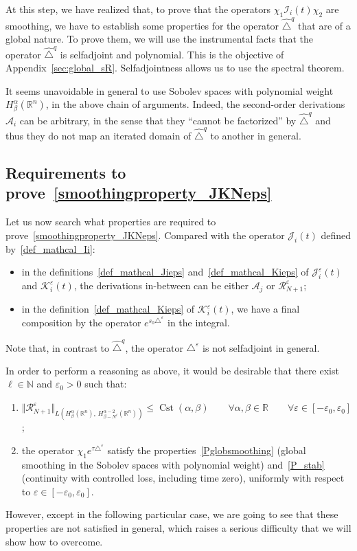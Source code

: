 \documentclass[AHL,Unicode,published]{cedram}
\newcommand*\R{\mathbb{R}}
\newcommand*\N{\mathbb{N}}
\newcommand{\calK}{\mathcal{K}}
\newcommand{\calA}{\mathcal{A}}
\newcommand{\calR}{\mathcal{R}}
\newcommand{\calI}{\mathcal{I}}
\newcommand{\calJ}{\mathcal{J}}
\DeclareMathOperator{\Cst}{Cst}
\renewcommand{\leq}{\leqslant}
\newcommand*{\romanenumi}{\renewcommand*{\theenumi}{\roman{enumi}}}
\let\oldforall\forall
\renewcommand*{\forall}{\mathrel{\oldforall}}
\begin{document}
At this step, we have realized that, to prove that the operators $\chi_1\calI_i(t)\chi_2$ are smoothing, we have to establish some properties for the operator $\widehat{\triangle}^q$ that are of a global nature. To prove them, we will use the instrumental facts that the operator $\widehat{\triangle}^q$ is selfadjoint and polynomial. This is the objective of Appendix~\ref{sec:global_sR}. Selfadjointness allows us to use the spectral theorem.

\begin{rema}
It seems unavoidable in general to use Sobolev spaces with polynomial weight $H^\alpha_\beta(\R^n)$, in the above chain of arguments. Indeed, the second-order derivations $\calA_i$ can be arbitrary, in the sense that they ``cannot be factorized'' by $\widehat{\triangle}^{q}$ and thus they do not map an iterated domain of $\widehat{\triangle}^{q}$ to another in general.
\end{rema}


\subsection{Requirements to prove~\eqref{smoothingproperty_JKNeps}}\label{sec_idea_eps}
Let us now search what properties are required to prove~\eqref{smoothingproperty_JKNeps}. Compared with the operator $\calJ_i(t)$ defined by~\eqref{def_mathcal_Ii}:
\begin{itemize}
\item in the definitions~\eqref{def_mathcal_Jieps} and~\eqref{def_mathcal_Kieps} of $\calJ_i^\varepsilon(t)$ and $\calK_i^\varepsilon(t)$, the derivations in-between can be either $\calA_j$ or $\calR_{N+1}^\varepsilon$;
\item in the definition~\eqref{def_mathcal_Kieps} of $\calK_i^\varepsilon(t)$, we have a final composition by the operator $e^{s_0\triangle^\varepsilon}$ in the integral.
\end{itemize}
Note that, in contrast to $\widehat{\triangle}^q$, the operator $\triangle^\varepsilon$ is not selfadjoint in general.

In order to perform a reasoning as above, it would be desirable that there exist $\ell\in\N$ and $\varepsilon_0>0$ such that:
\begin{enumerate}\romanenumi
\item\label{desirable_i}
$\Vert \calR_{N+1}^\varepsilon\Vert_{L(H^\alpha_\beta(\R^n),\,H^{\alpha-2}_{\beta-N^\ell}(\R^n))} \leq \Cst(\alpha,\beta) \qquad \forall\alpha,\beta\in\R \qquad \forall\varepsilon\in[-\varepsilon_0,\varepsilon_0]$;
\item\label{desirable_ii}
the operator $\chi_1 e^{\tau\triangle^\varepsilon}$ satisfy the properties~\eqref{Pglobsmoothing} (global smoothing in the Sobolev spaces with polynomial weight) and~\eqref{P_stab} (continuity with controlled loss, including time zero), uniformly with respect to $\varepsilon\in[-\varepsilon_0,\varepsilon_0]$.
\end{enumerate}
However, except in the following particular case, we are going to see that these properties are not satisfied in general, which raises a serious difficulty that we will show how to overcome.
\end{document}
